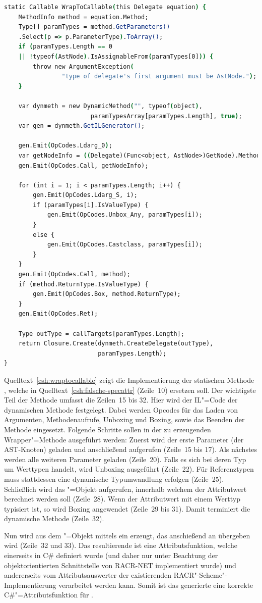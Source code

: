 \begin{lstlisting}[language=csh, caption={Dynamische Methodengenerierung und Typzuordnung}, label=csh:wraptocallable]
static Callable WrapToCallable(this Delegate equation) {
	MethodInfo method = equation.Method;
	Type[] paramTypes = method.GetParameters()
	.Select(p => p.ParameterType).ToArray();
	if (paramTypes.Length == 0
	|| !typeof(AstNode).IsAssignableFrom(paramTypes[0])) {
		throw new ArgumentException(
				"type of delegate's first argument must be AstNode.");
	}

	var dynmeth = new DynamicMethod("", typeof(object),
						paramTypesArray[paramTypes.Length], true);
	var gen = dynmeth.GetILGenerator();

	gen.Emit(OpCodes.Ldarg_0);
	var getNodeInfo = ((Delegate)(Func<object, AstNode>)GetNode).Method;
	gen.Emit(OpCodes.Call, getNodeInfo);
	
	for (int i = 1; i < paramTypes.Length; i++) {
		gen.Emit(OpCodes.Ldarg_S, i);
		if (paramTypes[i].IsValueType) {
			gen.Emit(OpCodes.Unbox_Any, paramTypes[i]);
		}
		else {
			gen.Emit(OpCodes.Castclass, paramTypes[i]);
		}
	}
	gen.Emit(OpCodes.Call, method);
	if (method.ReturnType.IsValueType) {
		gen.Emit(OpCodes.Box, method.ReturnType);
	}
	gen.Emit(OpCodes.Ret);

	Type outType = callTargets[paramTypes.Length];
	return Closure.Create(dynmeth.CreateDelegate(outType),
						  paramTypes.Length);
}
\end{lstlisting}

Quelltext~\ref{csh:wraptocallable} zeigt die Implementierung der statischen Methode , welche  in Quelltext~\ref{csh:falsche-specattr} (Zeile~10) ersetzen soll. Der wichtigste Teil der Methode umfasst die Zeilen~15 bis 32. Hier wird der IL"=Code der dynamischen Methode festgelegt. Dabei werden Opcodes für das Laden von Argumenten, Methodenaufrufe, Unboxing und Boxing, sowie das Beenden der Methode eingesetzt. Folgende Schritte sollen in der zu erzeugenden Wrapper"=Methode ausgeführt werden: Zuerst wird der erste Parameter (der AST-Knoten) geladen und anschließend  aufgerufen (Zeile~15 bis 17). Als nächstes werden alle weiteren Parameter geladen (Zeile~20). Falls es sich bei deren Typ um Werttypen handelt, wird Unboxing ausgeführt (Zeile~22). Für Referenztypen muss stattdessen eine dynamische Typumwandlung erfolgen (Zeile~25). Schließlich wird das "=Objekt aufgerufen, innerhalb welchem der Attributwert berechnet werden soll (Zeile~28). Wenn der Attributwert mit einem Werttyp typisiert ist, so wird Boxing angewendet (Zeile~29 bis 31). Damit terminiert die dynamische Methode (Zeile~32).

Nun wird aus dem "=Objekt mittels  ein  erzeugt, das anschießend an  übergeben wird (Zeile~32 und 33). Das resultierende  ist eine Attributsfunktion, welche einerseits in C\# definiert wurde (und daher nur unter Beachtung der objektorientierten Schnittstelle von RACR-NET implementiert wurde) und andererseits vom Attributsauswerter der existierenden RACR"-Scheme"-Implementierung verarbeitet werden kann. Somit ist das generierte  eine korrekte C\#"=Attributsfunktion für .
